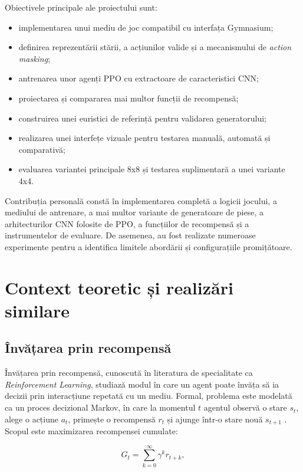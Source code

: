 \documentclass[12pt,a4paper]{article}
\begin{document}
Obiectivele principale ale proiectului sunt:
\begin{itemize}
    \item implementarea unui mediu de joc compatibil cu interfața Gymnasium;
    \item definirea reprezentării stării, a acțiunilor valide și a mecanismului de \textit{action masking};
    \item antrenarea unor agenți PPO cu extractoare de caracteristici CNN;
    \item proiectarea și compararea mai multor funcții de recompensă;
    \item construirea unei euristici de referință pentru validarea generatorului;
    \item realizarea unei interfețe vizuale pentru testarea manuală, automată și comparativă;
    \item evaluarea variantei principale 8x8 și testarea suplimentară a unei variante 4x4.
\end{itemize}

Contribuția personală constă în implementarea completă a logicii jocului, a mediului de antrenare, a mai multor variante de generatoare de piese, a arhitecturilor CNN folosite de PPO, a funcțiilor de recompensă și a instrumentelor de evaluare. De asemenea, au fost realizate numeroase experimente pentru a identifica limitele abordării și configurațiile promițătoare.

\section{Context teoretic și realizări similare}

\subsection{Învățarea prin recompensă}

Învățarea prin recompensă, cunoscută în literatura de specialitate ca \textit{Reinforcement Learning}, studiază modul în care un agent poate învăța să ia decizii prin interacțiune repetată cu un mediu. Formal, problema este modelată ca un proces decizional Markov, în care la momentul $t$ agentul observă o stare $s_t$, alege o acțiune $a_t$, primește o recompensă $r_t$ și ajunge într-o stare nouă $s_{t+1}$ \cite{sutton2018reinforcement}. Scopul este maximizarea recompensei cumulate:

\begin{equation}
    G_t = \sum_{k=0}^{\infty} \gamma^k r_{t+k},
\end{equation}
\end{document}
